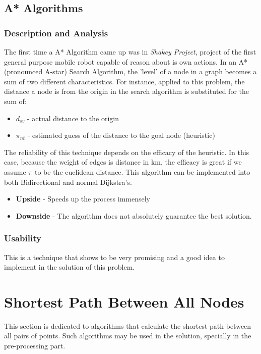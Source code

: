 \subsection{A* Algorithms}
\subsubsection{Description and Analysis}
The first time a A* Algorithm came up was in \textit{Shakey Project}, project of the first general purpose mobile robot capable of reason about is own actions. In an A* (pronounced A-star) Search Algorithm, the 'level' of a node in a graph becomes a sum of two different characteristics. For instance, applied to this problem, the distance a node is from the origin in the search algorithm is substituted for the sum of:
\begin{itemize}
    \item $d_{sv}$ - actual distance to the origin
    \item $\pi_{nt}$ - estimated guess of the distance to the goal node (heuristic)
\end{itemize}
The reliability of this technique depends on the efficacy of the heuristic. In this case, because the weight of edges is distance in km, the efficacy is great if we assume $\pi$ to be the euclidean distance. This algorithm can be implemented into both Bidirectional and normal Dijkstra's.
\begin{itemize}
    \item \textbf{Upside} - Speeds up the process immensely
    \item \textbf{Downside} - The algorithm does not absolutely guarantee the best solution.
\end{itemize}

\subsubsection{Usability}
This is a technique that shows to be very promising and a good idea to implement in the solution of this problem.



\newpage
\section{Shortest Path Between All Nodes}
This section is dedicated to algorithms that calculate the shortest path between all pairs of points. Such algorithms may be used in the solution, specially in the pre-processing part.

